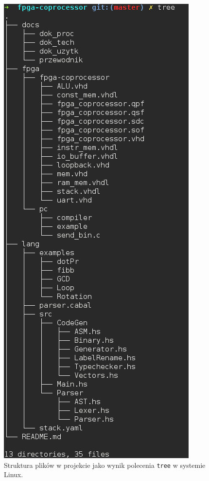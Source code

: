 \begin{figure}
  \begin{center}
    \includegraphics[scale=0.5]{images/file_structure.png}
    \caption{Struktura plików w projekcie jako wynik polecenia \texttt{tree} w systemie Linux.}
    \label{fig:file-structure}
  \end{center}
\end{figure}

